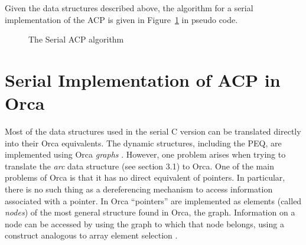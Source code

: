 Given the data structures described above, the algorithm for a serial
implementation of the ACP is given in Figure~\ref{mainloop}
in pseudo code.

\footnotesize
\begin{figure}
\begin{center}
\end{center}
\caption{The Serial ACP algorithm}
\label{mainloop}
\end{figure}
\normalsize

\section{Serial Implementation of ACP in Orca}

Most of the data structures used in the serial C version can be
translated directly into their Orca equivalents. The dynamic
structures, including the PEQ, are implemented using
Orca {\em graphs} \cite{orca}. However, one problem arises when trying to
translate the {\em arc} data structure (see section 3.1) to Orca. One
of the main problems of Orca is that it has no direct equivalent of
pointers. In particular, there is no such thing as a dereferencing
mechanism to access information associated with a pointer. In Orca
``pointers'' are implemented as elements (called {\em nodes}) of the most general
structure found in Orca, the graph. Information on a node can be accessed by
using the graph to which that node belongs, using a construct
analogous to array element selection \cite {orca}.


